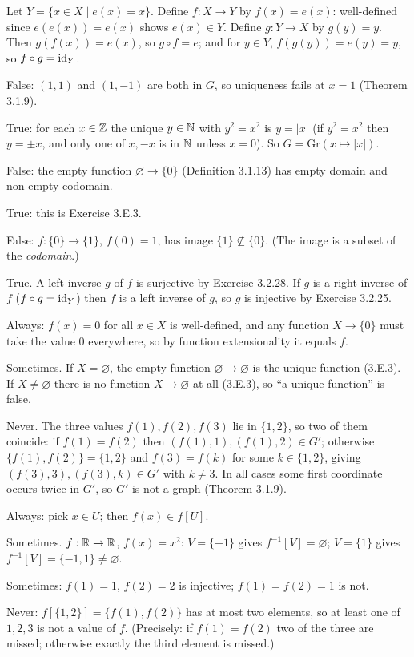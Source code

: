  Let $Y=\{x\in X\mid e(x)=x\}$. Define $f:X\to Y$ by $f(x)=e(x)$: well-defined since $e(e(x))=e(x)$ shows $e(x)\in Y$. Define $g:Y\to X$ by $g(y)=y$. Then $g(f(x))=e(x)$, so $g\circ f=e$; and for $y\in Y$, $f(g(y))=e(y)=y$, so $f\circ g=\mathrm{id}_Y$.

 False: $(1,1)$ and $(1,-1)$ are both in $G$, so uniqueness fails at $x=1$ (Theorem 3.1.9).

 True: for each $x\in\mathbb{Z}$ the unique $y\in\mathbb{N}$ with $y^2=x^2$ is $y=|x|$ (if $y^2=x^2$ then $y=\pm x$, and only one of $x,-x$ is in $\mathbb{N}$ unless $x=0$). So $G=\mathrm{Gr}(x\mapsto|x|)$.

 False: the empty function $\varnothing\to\{0\}$ (Definition 3.1.13) has empty domain and non-empty codomain.

 True: this is Exercise 3.E.3.

 False: $f:\{0\}\to\{1\}$, $f(0)=1$, has image $\{1\}\nsubseteq\{0\}$. (The image is a subset of the \emph{codomain}.)

 True. A left inverse $g$ of $f$ is surjective by Exercise 3.2.28. If $g$ is a right inverse of $f$ ($f\circ g=\mathrm{id}_Y$) then $f$ is a left inverse of $g$, so $g$ is injective by Exercise 3.2.25.

 Always: $f(x)=0$ for all $x\in X$ is well-defined, and any function $X\to\{0\}$ must take the value $0$ everywhere, so by function extensionality it equals $f$.

 Sometimes. If $X=\varnothing$, the empty function $\varnothing\to\varnothing$ is the unique function (3.E.3). If $X\ne\varnothing$ there is no function $X\to\varnothing$ at all (3.E.3), so ``a unique function'' is false.

 Never. The three values $f(1),f(2),f(3)$ lie in $\{1,2\}$, so two of them coincide: if $f(1)=f(2)$ then $(f(1),1),(f(1),2)\in G'$; otherwise $\{f(1),f(2)\}=\{1,2\}$ and $f(3)=f(k)$ for some $k\in\{1,2\}$, giving $(f(3),3),(f(3),k)\in G'$ with $k\ne3$. In all cases some first coordinate occurs twice in $G'$, so $G'$ is not a graph (Theorem 3.1.9).

 Always: pick $x\in U$; then $f(x)\in f[U]$.

 Sometimes. $f:\mathbb{R}\to\mathbb{R}$, $f(x)=x^2$: $V=\{-1\}$ gives $f^{-1}[V]=\varnothing$; $V=\{1\}$ gives $f^{-1}[V]=\{-1,1\}\ne\varnothing$.

 Sometimes: $f(1)=1$, $f(2)=2$ is injective; $f(1)=f(2)=1$ is not.

 Never: $f[\{1,2\}]=\{f(1),f(2)\}$ has at most two elements, so at least one of $1,2,3$ is not a value of $f$. (Precisely: if $f(1)=f(2)$ two of the three are missed; otherwise exactly the third element is missed.)
